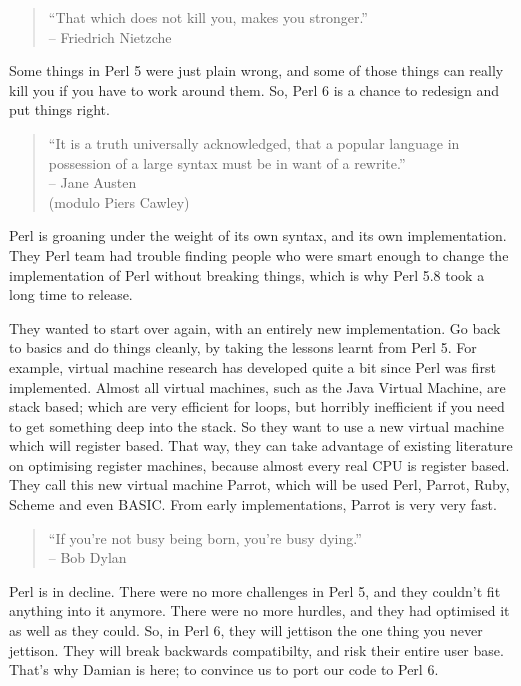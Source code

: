 \documentclass{article}
\begin{document}
\begin{quote}
``That which does not kill you, makes you stronger.''\\
\null\hfill-- Friedrich Nietzche
\end{quote}
Some things in Perl 5 were just plain wrong, and some of
those things can really kill you if you have to work around them.
So, Perl 6 is a chance to redesign and put things right.

\begin{quote}
``It is a truth universally acknowledged, that a popular language in
possession of a large syntax must be in want of a rewrite.''\\
\null\hfill-- Jane Austen\\
\null\hfill(modulo Piers Cawley)
\end{quote}
Perl is groaning under the weight of its
own syntax, and its own implementation.  They Perl team
had trouble finding people
who were smart enough to change the implementation of Perl without
breaking things, which is why Perl 5.8 took a long time to release.

They wanted to start over again, with an entirely new implementation.  
Go back to basics 
and do things cleanly, by taking the lessons learnt from Perl 5.  For
example, virtual machine research has developed quite a bit since
Perl was first implemented.  Almost all virtual machines, such as the
Java Virtual Machine, are stack based; which are very efficient for
loops, but horribly inefficient if you need to get something deep into
the stack.  So they want to use a new virtual machine which will
register based.  That way, they can take advantage of
existing literature on optimising register machines, because almost 
every real CPU is register based.  They call this new virtual machine
Parrot, which will be used Perl, Parrot, Ruby, Scheme and even BASIC.
From early implementations, Parrot is very very fast.

\begin{quote}
``If you're not busy being born, you're busy dying.''\\
\null\hfill-- Bob Dylan
\end{quote}
Perl is in decline.  There were no more challenges in Perl 5, and they
couldn't fit anything into it anymore.  There were no more hurdles, 
and they had optimised
it as well as they could.  So, in Perl 6, they will jettison the one thing
you never jettison.  They will break backwards compatibilty, and risk
their entire user base.  That's why
Damian is here; to convince us to port our code to Perl 6.
\end{document}
